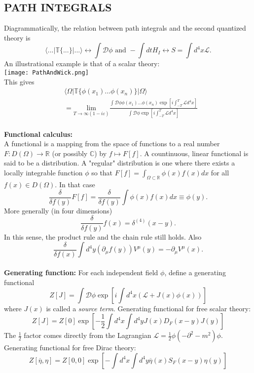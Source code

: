 \documentclass[a4paper, norsk, 8pt, landscape]{article}
\newcommand{\EQU}[1] { \begin{equation*} \begin{split}
#1
\end{split} \end{equation*} }
\newcommand{\ket}[1] { |#1\rangle }
\newcommand{\bra}[1] { \langle #1 | }
\begin{document}
\begin{multicols*}{3}
\subsection*{\small  PATH INTEGRALS}
Diagrammatically, the relation between path integrals and the second quantized theory is
\[
\bra{...}\mathbb{T}\{...\}\ket{...} \longleftrightarrow \int \mathcal{D}\phi
\text{ and }
-\int dt H_I \longleftrightarrow  S=\int d^4x \mathcal{L}.
\]
An illustrational example is that of a scalar theory: \\
\texttt{[image: PathAndWick.png]} \\
This gives
\EQU{
&\bra{\Omega}\mathbb{T}\{\phi(x_1)...\phi(x_n)\} \ket{\Omega} \\
&=
\underset{T\rightarrow \infty(1-i\varepsilon)}{\text{lim}}
\frac{
\int \mathcal{D}\phi \phi(x_1)...\phi(x_n)\exp \left[i\int_{-T}^T\mathcal{L}d^4x \right]
}{
\int \mathcal{D}\phi \exp \left[i\int_{-T}^T\mathcal{L}d^4x \right]
}
}
\\
 {\textbf{Functional calculus:}} \\
A functional is a mapping from the space of functions to a real number
$F: D(\Omega) \rightarrow \mathbb{R}$ (or possibly $\mathbb{C}$) by $f\mapsto F[f]$.
A countinuous, linear functional is said to be a distribution. A "regular" distribution is one where there exists
a locally integrable function $\phi$ so that $F[f]=\int_{\Omega \subset \mathbb{R}}\phi(x)f(x)dx$
for all $f(x)\in D(\Omega)$. In that case
\[
\frac{\delta }{\delta f(y)}F[f]
= \frac{\delta }{\delta f(y)} \int \phi(x)f(x)dx \equiv \phi(y).
\]
More generally (in four dimensions)
\[
\frac{\delta }{\delta f(y)}f(x)=\delta^{(4)}(x-y).
\]
In this sense, the product rule and the chain rule still holds. Also
\[
\frac{\delta }{\delta f(x)} \int d^4 y (\partial_\mu f(y)) V^\mu(y) = -\partial_\mu V^\mu(x).
\]
\\
 {\textbf{Generating function:}}
For each independent field $\phi$, define a generating functional \\
\[
Z[J]=\int \mathcal{D}\phi \exp \left[i\int d^4 x \left(\mathcal{L}+J(x)\phi(x)\right)\right]
\]
where $J(x)$ is called a {\it source term}.
Generating functional for free scalar theory:
\[
Z[J] = Z[0]\exp \left[-\frac{1}{2}\int d^4 x \int d^4 y J(x)D_F(x-y)J(y)\right]
\]
The $\frac{1}{2}$ factor comes directly from the Lagrangian $\mathcal{L}=\frac{1}{2}\phi(-\partial^2-m^2)\phi$.
Generating functional for free Dirac theory:
\[
Z[\overline{\eta},\eta] = Z[0,0]\exp \left[-\int d^4 x \int d^4 y \overline{\eta}(x)S_F(x-y)\eta(y)\right]
\]














\end{multicols*}
\end{document}
